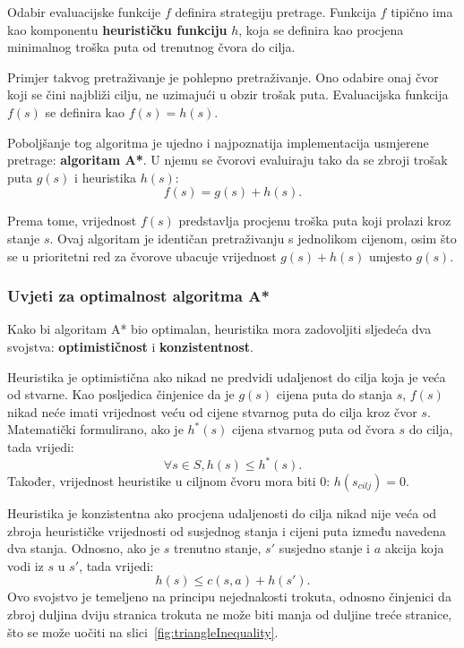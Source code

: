 \documentclass[times, utf8, zavrsni, numeric]{fer}
\begin{document}
\par Odabir evaluacijske funkcije \(f\) definira strategiju pretrage. 
Funkcija \(f\) tipično ima kao komponentu \textbf{heurističku funkciju} \(h\), koja se definira kao procjena minimalnog troška puta od trenutnog čvora do cilja\cite{book:AIModernApproach}.

\par Primjer takvog pretraživanje je pohlepno pretraživanje. 
Ono odabire onaj čvor koji se čini najbliži cilju, ne uzimajući u obzir trošak puta.
Evaluacijska funkcija \(f(s)\) se definira kao \(f(s) = h(s)\).

\par Poboljšanje tog algoritma je ujedno i najpoznatija implementacija usmjerene pretrage: \textbf{algoritam A*}. 
U njemu se čvorovi evaluiraju tako da se zbroji trošak puta \(g(s)\) i heuristika \(h(s)\):
\begin{equation}
f(s) = g(s) + h(s).
\end{equation} 

Prema tome, vrijednost \(f(s)\) predstavlja procjenu troška puta koji prolazi kroz stanje \(s\).
Ovaj algoritam je identičan pretraživanju s jednolikom cijenom, osim što se u prioritetni red za čvorove ubacuje vrijednost \(g(s) + h(s)\) umjesto \(g(s)\).

\subsubsection{Uvjeti za optimalnost algoritma A*}
Kako bi algoritam A* bio optimalan, heuristika mora zadovoljiti sljedeća dva svojstva: \textbf{optimističnost} i \textbf{konzistentnost}.

\par Heuristika je optimistična ako nikad ne predvidi udaljenost do cilja koja je veća od stvarne. 
Kao posljedica činjenice da je \(g(s)\) cijena puta do stanja \(s\), \(f(s)\) nikad neće imati vrijednost veću od cijene stvarnog puta do cilja kroz čvor \(s\).
Matematički formulirano, ako je \(h^*(s)\) cijena stvarnog puta od čvora \(s\) do cilja, tada vrijedi:
\begin{equation}
\forall s \in S, h(s) \leq h^*(s).
\end{equation} 
Također, vrijednost heuristike u ciljnom čvoru mora biti 0: \(h(s_{cilj}) = 0\).

\par Heuristika je konzistentna ako procjena udaljenosti do cilja nikad nije veća  od zbroja heurističke vrijednosti od susjednog stanja i cijeni puta između navedena dva stanja.
Odnosno, ako je \(s\) trenutno stanje, \(s'\) susjedno stanje i \(a\) akcija koja vodi iz \(s\) u \(s'\), tada vrijedi:
\begin{equation}
h(s) \leq c(s, a) + h(s').
\end{equation} 
Ovo svojstvo je temeljeno na principu nejednakosti trokuta, odnosno činjenici da zbroj duljina dviju stranica trokuta ne može biti manja od duljine treće stranice, što se može uočiti na slici~\ref{fig:triangleInequality}.
\end{document}
